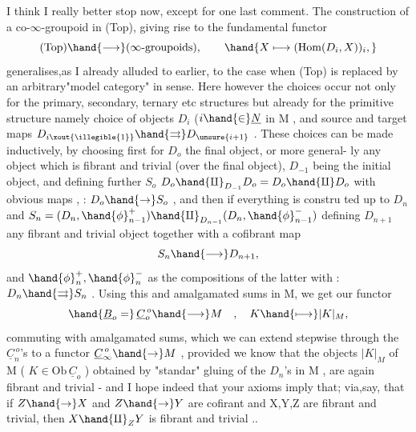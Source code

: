 

 I think I really better stop now, except for one last comment. The
construction of a co-$\infty$-groupoid  in (Top), giving rise to the fundamental
functor
\[ \text{(Top)} \hand{\longrightarrow} (\infty\text{-groupoids}), \qquad \hand{X \longmapsto (\mathrm{Hom}(D_i,X))_i ,} \]
generalises,as I already alluded to earlier, to the case when (Top) is
replaced by an arbitrary"model category"  in   sense. Here however the
choices occur not only  for the primary, secondary, ternary etc structures\hand{,}
but already for the primitive structure\hand{,} namely  choice of objects $D_i$ ($i\hand{\in}\underline{N}$
in M , and source and target maps $D_{i\xout{\illegible{1}}} \hand{\rightrightarrows} D_{\unsure{i+1}}$ . These choices can be made
inductively, by choosing first for $D_o$ the final object, or more general-%
ly any object which is fibrant and trivial (over the final object), $D_{-1}$
being the initial object, and defining further $S_o$  $D_o\hand{\amalg}_{D_{-1}} D_o = D_o \hand{\amalg} D_o$
with obvious maps  ,  : $D_o \hand{\to} S_o$ , and then \hand{,}if everything is constru\hand{-}
ted up to $D_n$ \deleted{\unsure{,}} and $S_n = (D_n,\hand{\phi}_{n-1}^+)\hand{\amalg}_{D_{n-1}}(D_n,\hand{\phi}_{n-1}^-)$\hand{,} defining $D_{n+1}$  any
fibrant and trivial object together with a cofibrant map
\[ S_n \hand{\longrightarrow} D_{n+1} , \]
and $\hand{\phi}_n^+ , \hand{\phi}_n^-$ as the compositions of the latter with  : $D_n \hand{\rightrightarrows} S_n$ .
Using this and amalgamated sums in M, we get our functor
\[ \hand{\underline{B}_o =}\, \underline{C}_o^{\,o} \hand{\longrightarrow} M \quad , \quad K \hand{\longmapsto} |K|_M , \]
commuting with amalgamated sums, which we can extend stepwise through
the $\underline{C}_n^{\,o}$'s to a functor  $\underline{C}_\infty^{\,o} \hand{\to} M$ , provided we know that the objects
$|K|_M$ of M ( $K \in \mathrm{Ob}\,\underline{C}_o$ ) obtained  by "standar" gluing of the
$D_n$'s in M , are again fibrant and trivial - and I hope indeed that
your axioms imply that; via,say, that if $Z\hand{\to} X$ and $Z \hand{\to} Y$ are cofirant
and X,Y,Z are fibrant and trivial, then $X\hand{\amalg}_Z Y$ is fibrant and trivial ..

